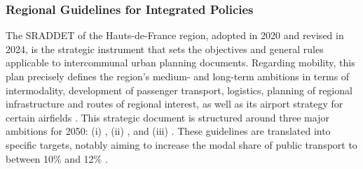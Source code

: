 \begin{refsegment}
\subsubsection*{Regional Guidelines for Integrated Policies
    \label{chap3:region-hdf-politiques}
    }

The \acrfull{SRADDET} of the Hauts-de-France region, adopted in 2020 and revised in 2024, is the strategic instrument that sets the objectives and general rules applicable to intercommunal urban planning documents. Regarding mobility, this plan precisely defines the region's medium- and long-term ambitions in terms of intermodality, development of passenger transport, logistics, planning of regional infrastructure and routes of regional interest, as well as its airport strategy for certain airfields \textcolor{blue}{\autocite[1]{cerema_sraddet_2024}}. This strategic document is structured around three major ambitions for 2050: (i) , (ii) , and (iii)  \textcolor{blue}{\autocite[7]{region_hauts-de-france_sraddet_2024}}. These guidelines are translated into specific targets, notably aiming to increase the modal share of public transport to between 10\% and 12\% \textcolor{blue}{\autocite[169]{region_hauts-de-france_sraddet_2024}}.%


\end{refsegment}

